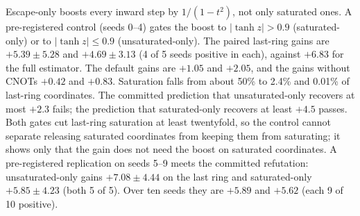 Escape-only boosts every inward step by $1/(1-t^2)$, not only saturated ones. A pre-registered control (seeds 0--4) gates the boost to $|\tanh z|>0.9$ (saturated-only) or to $|\tanh z|\le0.9$ (unsaturated-only). The paired last-ring gains are $+5.39\pm5.28$ and $+4.69\pm3.13$ (4 of 5 seeds positive in each), against $+6.83$ for the full estimator. The default gains are $+1.05$ and $+2.05$, and the gains without CNOTs $+0.42$ and $+0.83$. Saturation falls from about 50\% to 2.4\% and 0.01\% of last-ring coordinates. The committed prediction that unsaturated-only recovers at most $+2.3$ fails; the prediction that saturated-only recovers at least $+4.5$ passes. Both gates cut last-ring saturation at least twentyfold, so the control cannot separate releasing saturated coordinates from keeping them from saturating; it shows only that the gain does not need the boost on saturated coordinates. A pre-registered replication on seeds 5--9 meets the committed refutation: unsaturated-only gains $+7.08\pm4.44$ on the last ring and saturated-only $+5.85\pm4.23$ (both 5 of 5). Over ten seeds they are $+5.89$ and $+5.62$ (each 9 of 10 positive).
